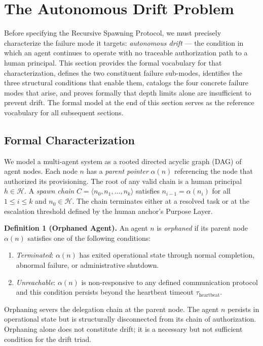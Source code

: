 \section{The Autonomous Drift Problem}
\label{sec:drift}

Before specifying the Recursive Spawning Protocol, we must precisely characterize the failure mode it targets: \emph{autonomous drift} — the condition in which an agent continues to operate with no traceable authorization path to a human principal. This section provides the formal vocabulary for that characterization, defines the two constituent failure sub-modes, identifies the three structural conditions that enable them, catalogs the four concrete failure modes that arise, and proves formally that depth limits alone are insufficient to prevent drift. The formal model at the end of this section serves as the reference vocabulary for all subsequent sections.

\subsection{Formal Characterization}
\label{sec:drift-formal}

We model a multi-agent system as a rooted directed acyclic graph (DAG) of agent nodes. Each node $n$ has a \emph{parent pointer} $\alpha(n)$ referencing the node that authorized its provisioning. The root of any valid chain is a human principal $h \in \mathcal{H}$. A \emph{spawn chain} $C = \langle n_0, n_1, \ldots, n_k \rangle$ satisfies $n_{i-1} = \alpha(n_i)$ for all $1 \leq i \leq k$ and $n_0 \in \mathcal{H}$. The chain terminates either at a resolved task or at the escalation threshold defined by the human anchor's Purpose Layer.

\medskip
\noindent\textbf{Definition 1 (Orphaned Agent).}
An agent $n$ is \emph{orphaned} if its parent node $\alpha(n)$ satisfies one of the following conditions:
\begin{enumerate}
  \item[(a)] \emph{Terminated}: $\alpha(n)$ has exited operational state through normal completion, abnormal failure, or administrative shutdown.
  \item[(b)] \emph{Unreachable}: $\alpha(n)$ is non-responsive to any defined communication protocol and this condition persists beyond the heartbeat timeout $\tau_{\text{heartbeat}}$.
\end{enumerate}
Orphaning severs the delegation chain at the parent node. The agent $n$ persists in operational state but is structurally disconnected from its chain of authorization. Orphaning alone does not constitute drift; it is a necessary but not sufficient condition for the drift triad.

